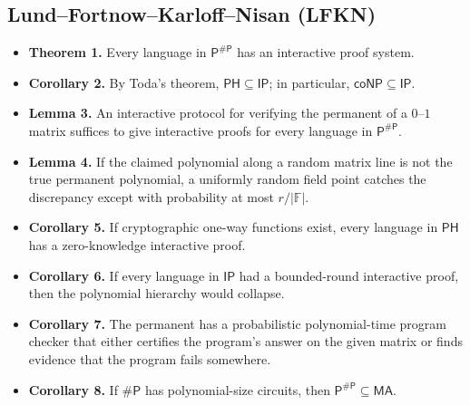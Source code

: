 \documentclass[10pt]{article}
\newcommand{\F}{\mathbb F}
\newcommand{\IP}{\mathsf{IP}}
\newcommand{\PH}{\mathsf{PH}}
\newcommand{\coNP}{\mathsf{coNP}}
\begin{document}
\subsection*{Lund--Fortnow--Karloff--Nisan (LFKN)}
\begin{itemize}
\item \textbf{Theorem 1.} Every language in $\mathsf P^{\#\mathsf P}$ has an
interactive proof system.
\item \textbf{Corollary 2.} By Toda's theorem,
$\PH\subseteq\IP$; in particular, $\coNP\subseteq\IP$.
\item \textbf{Lemma 3.} An interactive protocol for verifying the permanent of
a $0$--$1$ matrix suffices to give interactive proofs for every language in
$\mathsf P^{\#\mathsf P}$.
\item \textbf{Lemma 4.} If the claimed polynomial along a random matrix line is
not the true permanent polynomial, a uniformly random field point catches the
discrepancy except with probability at most $r/|\F|$.
\item \textbf{Corollary 5.} If cryptographic one-way functions exist, every
language in $\PH$ has a zero-knowledge interactive proof.
\item \textbf{Corollary 6.} If every language in $\IP$ had a bounded-round
interactive proof, then the polynomial hierarchy would collapse.
\item \textbf{Corollary 7.} The permanent has a probabilistic polynomial-time
program checker that either certifies the program's answer on the given matrix
or finds evidence that the program fails somewhere.
\item \textbf{Corollary 8.} If $\#\mathsf P$ has polynomial-size circuits, then
$\mathsf P^{\#\mathsf P}\subseteq\mathsf{MA}$.
\end{itemize}
\end{document}
